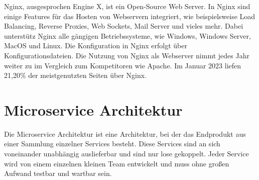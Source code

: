 Nginx, ausgesprochen Engine X, ist ein Open-Source Web Server.
In Nginx sind einige Features für das Hosten von Webservern integriert, wie beispielsweise Load Balancing, Reverse Proxies, Web Sockets, Mail Server und vieles mehr.
Dabei unterstütz Nginx alle gängigen Betriebssysteme, wie Windows, Windows Server, MacOS und Linux.
Die Konfiguration in Nginx erfolgt über Konfigurationsdateien.
Die Nutzung von Nginx als Webserver nimmt jedes Jahr weiter zu im Vergleich zum Kompetitoren wie Apache.
Im Januar 2023 liefen 21,20\% der meistgenutzten Seiten über Nginx.
~\autocite{nginx:nginx}

\section{Microservice Architektur}
\label{sec:microservices}

Die Microservice Architektur ist eine Architektur, bei der das Endprodukt aus einer Sammlung einzelner Services besteht.
Diese Services sind an sich voneinander unabhängig auslieferbar und sind nur lose gekoppelt.
Jeder Service wird von einem einzelnen kleinen Team entwickelt und muss ohne großen Aufwand testbar und wartbar sein.
~\autocite{richardson:microservices}
